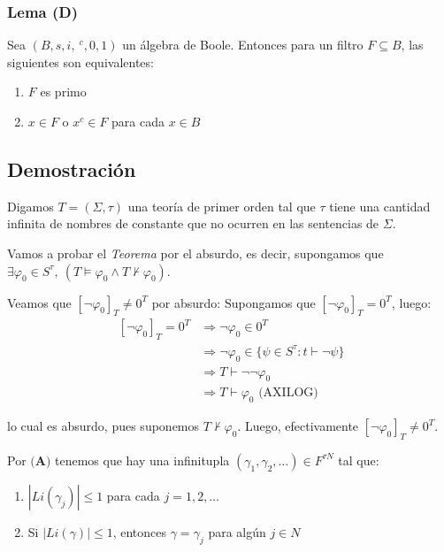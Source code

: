 \documentclass{article}
\begin{document}
\subsubsection*{Lema (D)}
Sea $(B,s,i,\ ^c,0,1)$ un álgebra de Boole. Entonces para un filtro $F\subseteq B$, las siguientes son equivalentes:
\begin{enumerate}
  \item $F$ es primo
  \item $x\in F$ o $x^c\in F$ para cada $x\in B$
\end{enumerate}

\subsection*{Demostración}
Digamos $T=(\Sigma,\tau)$ una teoría de primer orden tal que $\tau$ tiene una cantidad infinita de nombres de constante que no ocurren en las sentencias de $\Sigma$.

Vamos a probar el \textit{Teorema} por el absurdo, es decir, supongamos que $\exists\varphi_0\in S^\tau,\ (T\vDash\varphi_0\land T\nvdash\varphi_0)$.

\vspace{0.3cm}
Veamos que $[\neg\varphi_0]_T\neq 0^T$ por absurdo: Supongamos que $[\neg\varphi_0]_T=0^T$, luego:
\begin{equation*}
  \begin{aligned}
    \ [\neg\varphi_0]_T=0^T & \Rightarrow \neg\varphi_0\in 0^T                              \\
                            & \Rightarrow\neg\varphi_0\in\{\psi\in S^\tau:t\vdash\neg\psi\} \\
                            & \Rightarrow T\vdash\neg\neg\varphi_0                          \\
                            & \Rightarrow T\vdash\varphi_0\text{ (AXILOG)}
  \end{aligned}
\end{equation*}

lo cual es absurdo, pues suponemos $T\nvdash\varphi_0$. Luego, efectivamente $[\neg\varphi_0]_T\neq 0^T$.

\vspace{0.3cm}
Por $\textbf{(A)}$ tenemos que hay una infinitupla $(\gamma_1,\gamma_2,\dots)\in F^{\tau N}$ tal que:
\begin{enumerate}
  \item $|Li(\gamma_j)|\leq 1$ para cada $j=1,2,\dots$
  \item Si $|Li(\gamma)|\leq 1$, entonces $\gamma=\gamma_j$ para algún $j\in N$
\end{enumerate}
\end{document}
